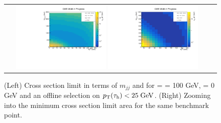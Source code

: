 \begin{figure}[tbh!]
	\centering
	\begin{tabular}{cc}
		\includegraphics[width=0.45\textwidth]{analysis/pics/JetInvMass_vs_MET_xsec_chi100_lsp000_taupt25.pdf}
		\includegraphics[width=0.45\textwidth]{analysis/pics/JetInvMass_vs_MET_xsec_chi100_lsp000_taupt25_zoom.pdf} 		
	\end{tabular}
	\caption{(Left) Cross section limit in terms of $m_{jj}$ and \met for \charginopm = \neutralinotwo = 100 GeV, \neutralinoone = 0 GeV and an offline selection on $p_{\text{T}}(\tau_{\text{h}}) <  25\;\text{Ge}\kern-0.06667em\text{V}$. (Right) Zooming into the minimum cross section limit area for the same benchmark point.}
	\label{fig::JetInvMass_vs_MET_xsec_chi100_lsp000_taupt25}
\end{figure}


